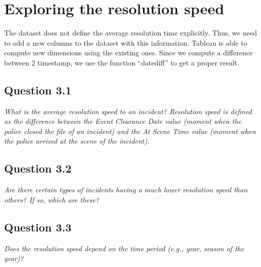 \section{Exploring the resolution speed}

The dataset does not define the average resolution time explicitly.
Thus, we need to add a new columns to the dataset with this information.
Tableau is able to compute new dimensions using the existing ones.
Since we compute a difference between $2$ timestamp, we use the function ``datediff'' to get a proper result.


\subsection*{Question 3.1}
\textit{What is the average resolution speed to an incident? Resolution speed is defined as the difference between the Event Clearance Date value (moment when the police closed the file of an incident) and the At Scene Time value (moment when the police arrived at the scene of the incident).}

\subsection*{Question 3.2}
\textit{Are there certain types of incidents having a much lower resolution speed than others? If so, which are these?}

\subsection*{Question 3.3}
\textit{Does the resolution speed depend on the time period (e.g., year, season of the year)?}

